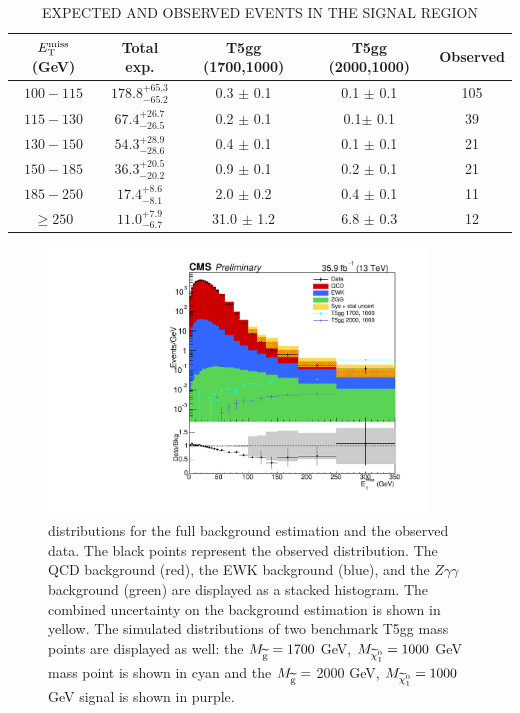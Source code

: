\begin{table}[ht]
    \caption{EXPECTED AND OBSERVED EVENTS IN THE SIGNAL REGION}
    \centering

    \begin{tabular}{ |c|c|c|c|c|}
        \hline
        \hline
        $E_{\mathrm{T}}^{\text{miss}}$ (GeV) & Total exp. & T5gg (1700,1000) & T5gg (2000,1000)& Observed \\
        \hline
        \hline
        $100-115$ & ${ 178.8 }^{+ 65.3 }_{- 65.2 }$ & 0.3 $\pm$ 0.1& 0.1 $\pm$ 0.1&105 \\
	$115-130$ & ${ 67.4 }^{+ 26.7 }_{- 26.5 }$  & 0.2 $\pm$ 0.1& 0.1$\pm$ 0.1&39  \\
	$130-150$ & ${ 54.3 }^{+ 28.9 }_{- 28.6 }$  & 0.4 $\pm$ 0.1& 0.1 $\pm$ 0.1&21 \\
	$150-185$ & ${ 36.3 }^{+ 20.5 }_{- 20.2 }$  & 0.9 $\pm$ 0.1& 0.2 $\pm$ 0.1&21 \\
	$185-250$ & ${ 17.4 }^{+ 8.6 }_{- 8.1 }$     & 2.0  $\pm$ 0.2& 0.4 $\pm$ 0.1&11 \\
	$\geq 250$& ${ 11.0 }^{+ 7.9 }_{- 6.7 }$      & 31.0 $\pm$ 1.2&6.8 $\pm$ 0.3& 12 \\

        \hline
        \hline
    \end{tabular}
    \label{tab:ExpObs}
\end{table}

\begin{figure}[h]
\begin{center}
\includegraphics[width=0.9\textwidth]{Figures/Results/finalPlot.pdf}
\end{center}
\caption[\ETmiss distributions for the full background estimation and the observed data.]
{\ETmiss distributions for the full background estimation and the observed data. 
	The black points represent the observed \ETmiss distribution. 
	The QCD background (red), the EWK background
	(blue), and the $Z\gamma\gamma$ background (green) are displayed as a stacked histogram. 
	The combined uncertainty on the background estimation is shown in yellow.
	The simulated \ETmiss distributions of two benchmark T5gg mass points are displayed as well:
	the $M_{\widetilde{\mathrm{g}}} = 1700$ GeV, $M_{\widetilde{\chi}^{0}_{1}} = 1000$ GeV mass point is shown in cyan and the
	 $M_{\widetilde{\mathrm{g}} }=$ 2000 GeV, $M_{\widetilde{\chi}^{0}_{1}} = 1000$ GeV signal is shown in purple.}
\label{fig:FinalPlot}
\end{figure}

